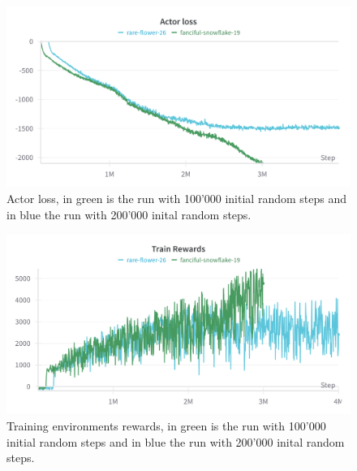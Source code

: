 \documentclass[11pt, a4paper]{article}
\begin{document}
\begin{figure}
    \centering
    \includegraphics[width=15cm]{SAC_actor_loss.png}
    \caption{Actor loss, in green is the run with 100'000 initial random steps
    and in blue the run with 200'000 inital random steps.}
    \label{SAC:acc_loss}
\end{figure}

\begin{figure}
    \centering
    \includegraphics[width=15cm]{SAC_train_reward.png}
    \caption{Training environments rewards, in green is the run with 100'000 initial random steps
    and in blue the run with 200'000 inital random steps.}
    \label{SAC:tr_rew}
\end{figure}

{}

\end{document}

